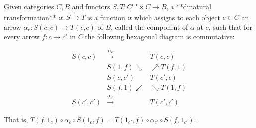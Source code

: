 Given categories $C, B$ and functors $S, T: C^{\text{op}} \times C \rightarrow B$, a **dinatural transformation** $\alpha: S \mathbin{\dot{\rightarrow}} T$ is a function $\alpha$ which assigns to each object $c \in C$ an arrow $\alpha_c: S(c, c) \rightarrow T(c, c)$ of $B$, called the component of $\alpha$ at $c$, such that for every arrow $f: c \rightarrow c'$ in $C$ the following hexagonal diagram is commutative:

$$\begin{array}{ccc}
S(c, c) & \xrightarrow{\alpha_c} & T(c, c) \\
& S(1, f) \searrow & \nearrow T(f, 1) \\
& S(c, c') & T(c', c) \\
& S(f, 1) \swarrow & \searrow T(1, f) \\
S(c', c') & \xrightarrow{\alpha_{c'}} & T(c', c')
\end{array}$$

That is, $T(f, 1_c) \circ \alpha_c \circ S(1_c, f) = T(1_{c'}, f) \circ \alpha_{c'} \circ S(f, 1_{c'})$.
